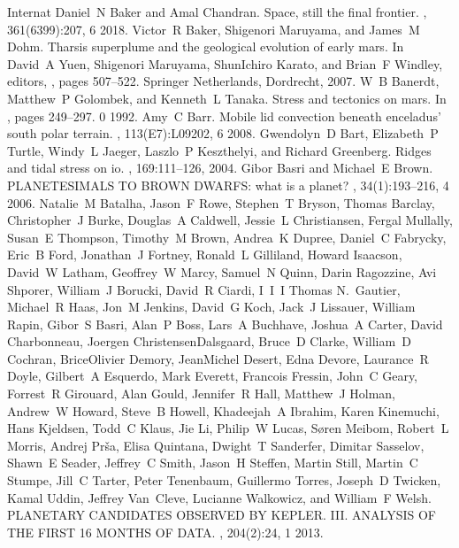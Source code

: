 \documentclass[letterpaper,10pt,english]{jupyterBook}
\begin{document}
\begin{sphinxthebibliography}{Internat}
\sphinxAtStartPar
Daniel N Baker and Amal Chandran. Space, still the final frontier. , 361(6399):207, 6 2018.
\sphinxAtStartPar
Victor R Baker, Shigenori Maruyama, and James M Dohm. Tharsis superplume and the geological evolution of early mars. In David A Yuen, Shigenori Maruyama, Shun\sphinxhyphen{}Ichiro Karato, and Brian F Windley, editors, , pages 507–522. Springer Netherlands, Dordrecht, 2007.
\sphinxAtStartPar
W B Banerdt, Matthew P Golombek, and Kenneth L Tanaka. Stress and tectonics on mars. In , pages 249–297. 0 1992.
\sphinxAtStartPar
Amy C Barr. Mobile lid convection beneath enceladus' south polar terrain. , 113(E7):L09202, 6 2008.
\sphinxAtStartPar
Gwendolyn D Bart, Elizabeth P Turtle, Windy L Jaeger, Laszlo P Keszthelyi, and Richard Greenberg. Ridges and tidal stress on io. , 169:111–126, 2004.
\sphinxAtStartPar
Gibor Basri and Michael E Brown. PLANETESIMALS TO BROWN DWARFS: what is a planet? , 34(1):193–216, 4 2006.
\sphinxAtStartPar
Natalie M Batalha, Jason F Rowe, Stephen T Bryson, Thomas Barclay, Christopher J Burke, Douglas A Caldwell, Jessie L Christiansen, Fergal Mullally, Susan E Thompson, Timothy M Brown, Andrea K Dupree, Daniel C Fabrycky, Eric B Ford, Jonathan J Fortney, Ronald L Gilliland, Howard Isaacson, David W Latham, Geoffrey W Marcy, Samuel N Quinn, Darin Ragozzine, Avi Shporer, William J Borucki, David R Ciardi, I I I Thomas N. Gautier, Michael R Haas, Jon M Jenkins, David G Koch, Jack J Lissauer, William Rapin, Gibor S Basri, Alan P Boss, Lars A Buchhave, Joshua A Carter, David Charbonneau, Joergen Christensen\sphinxhyphen{}Dalsgaard, Bruce D Clarke, William D Cochran, Brice\sphinxhyphen{}Olivier Demory, Jean\sphinxhyphen{}Michel Desert, Edna Devore, Laurance R Doyle, Gilbert A Esquerdo, Mark Everett, Francois Fressin, John C Geary, Forrest R Girouard, Alan Gould, Jennifer R Hall, Matthew J Holman, Andrew W Howard, Steve B Howell, Khadeejah A Ibrahim, Karen Kinemuchi, Hans Kjeldsen, Todd C Klaus, Jie Li, Philip W Lucas, Søren Meibom, Robert L Morris, Andrej Prša, Elisa Quintana, Dwight T Sanderfer, Dimitar Sasselov, Shawn E Seader, Jeffrey C Smith, Jason H Steffen, Martin Still, Martin C Stumpe, Jill C Tarter, Peter Tenenbaum, Guillermo Torres, Joseph D Twicken, Kamal Uddin, Jeffrey Van Cleve, Lucianne Walkowicz, and William F Welsh. PLANETARY CANDIDATES OBSERVED BY KEPLER. III. ANALYSIS OF THE FIRST 16 MONTHS OF DATA. , 204(2):24, 1 2013.

\end{sphinxthebibliography}
\end{document}
